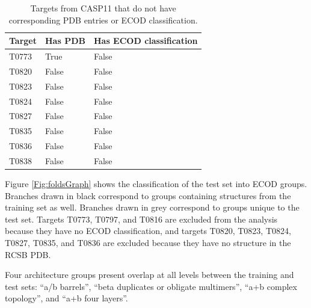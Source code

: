 \documentclass[letter,10pt]{article}
\begin{document}
\begin{table}[H]
\begin{center}
\begin{tabular}{ l | l | l }

    Target & Has PDB & Has ECOD classification \\
    \hline
    T0773 &True &False\\
    T0820 &False &False\\
    T0823 &False &False\\
    T0824 &False &False\\
    T0827 &False &False\\
    T0835 &False &False\\
    T0836 &False &False\\
    T0838 &False &False\\
\end{tabular}
   
\caption{Targets from CASP11 that do not have corresponding PDB entries or ECOD classification.}
%
\label{Tbl:CASP11PDB_ECOD}
\end{center}
\end{table}


Figure \ref{Fig:foldsGraph} shows the classification of the test set
into ECOD groups. Branches drawn in black correspond to groups
containing structures from the training set as well. Branches drawn in
grey correspond to groups unique to the test set. Targets T0773,
T0797, and T0816 are excluded from the analysis because they have no
ECOD classification, and targets T0820, T0823, T0824, T0827, T0835,
and T0836 are excluded because they have no structure in the RCSB PDB.

Four architecture groups present overlap at all levels between the
training and test sets: ``a/b barrels'', ``beta duplicates or obligate
multimers'', ``a+b complex topology'', and ``a+b four layers''.
\end{document}
